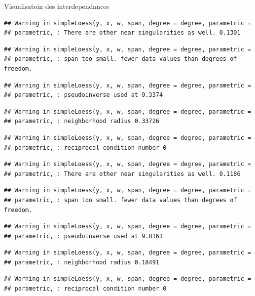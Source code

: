 \documentclass[11pt,ignorenonframetext,]{beamer}
\begin{document}
\begin{frame}[fragile]{Visualisatoin des interdependances}
\begin{verbatim}
## Warning in simpleLoess(y, x, w, span, degree = degree, parametric =
## parametric, : There are other near singularities as well. 0.1301
\end{verbatim}

\begin{verbatim}
## Warning in simpleLoess(y, x, w, span, degree = degree, parametric =
## parametric, : span too small. fewer data values than degrees of freedom.
\end{verbatim}

\begin{verbatim}
## Warning in simpleLoess(y, x, w, span, degree = degree, parametric =
## parametric, : pseudoinverse used at 9.3374
\end{verbatim}

\begin{verbatim}
## Warning in simpleLoess(y, x, w, span, degree = degree, parametric =
## parametric, : neighborhood radius 0.33726
\end{verbatim}

\begin{verbatim}
## Warning in simpleLoess(y, x, w, span, degree = degree, parametric =
## parametric, : reciprocal condition number 0
\end{verbatim}

\begin{verbatim}
## Warning in simpleLoess(y, x, w, span, degree = degree, parametric =
## parametric, : There are other near singularities as well. 0.1186
\end{verbatim}

\begin{verbatim}
## Warning in simpleLoess(y, x, w, span, degree = degree, parametric =
## parametric, : span too small. fewer data values than degrees of freedom.
\end{verbatim}

\begin{verbatim}
## Warning in simpleLoess(y, x, w, span, degree = degree, parametric =
## parametric, : pseudoinverse used at 9.8161
\end{verbatim}

\begin{verbatim}
## Warning in simpleLoess(y, x, w, span, degree = degree, parametric =
## parametric, : neighborhood radius 0.18491
\end{verbatim}

\begin{verbatim}
## Warning in simpleLoess(y, x, w, span, degree = degree, parametric =
## parametric, : reciprocal condition number 0
\end{verbatim}


\end{frame}
\end{document}
